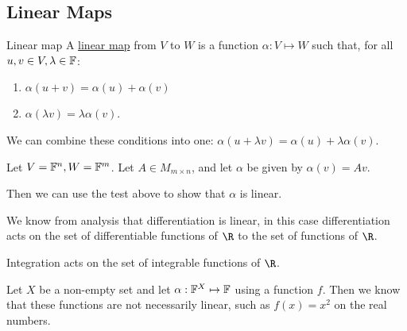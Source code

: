 \documentclass[../Main.tex]{subfiles}
\begin{document}
\subsection{Linear Maps}
\begin{definition}{Linear map}
    A \underline{linear map} from $V$ to $W$ is a function $\alpha : V \mapsto W$ such that, for all $u, v \in V, \lambda \in \mathbb{F}$:
    \begin{enumerate}
        \item $\alpha(u + v) = \alpha(u) + \alpha(v)$
        \item $\alpha(\lambda v) = \lambda \alpha(v)$.
    \end{enumerate}
\end{definition}
We can combine these conditions into one: $\alpha(u + \lambda v) = \alpha(u) + \lambda \alpha(v)$.

\begin{example}
    Let $V = \mathbb{F}^n, W = \mathbb{F}^m$. Let $A \in M_{m \times n}$, and let $\alpha$ be given by $\alpha(v) = Av$.

    Then we can use the test above to show that $\alpha$ is linear.
\end{example}
\begin{example}
    We know from analysis that differentiation is linear, in this case differentiation acts on the set of differentiable functions of $\R$ to the set of functions of $\R$.

    Integration acts on the set of integrable functions of $\R$.
\end{example}
\begin{example}
    Let $X$ be a non-empty set and let $\alpha : \mathbb{F}^X \mapsto \mathbb{F}$ using a function $f$. Then we know that these functions are not necessarily linear, such as $f(x) = x^2$ on the real numbers.
\end{example}
\end{document}
